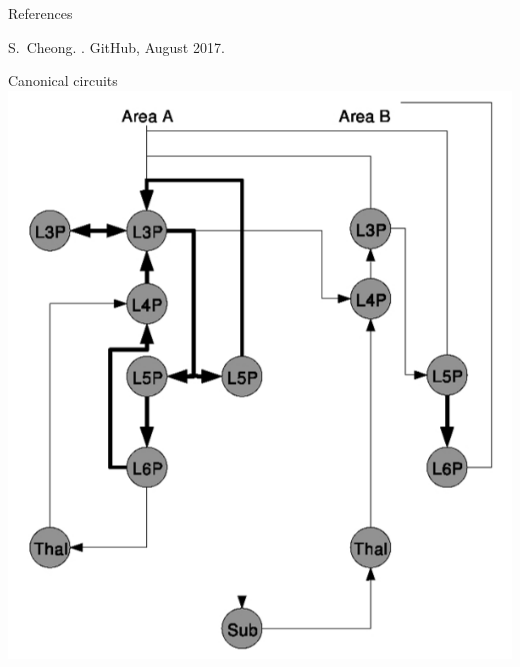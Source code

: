 \begin{frame}{References}
\begin{thebibliography}{3}
	S.~Cheong. . {GitHub}, August 2017.
\end{thebibliography}
\end{frame}


\begin{frame}{ Canonical circuits }
    \centering
    \includegraphics[height=0.8\textheight]{media/canonical}
\end{frame}
%
